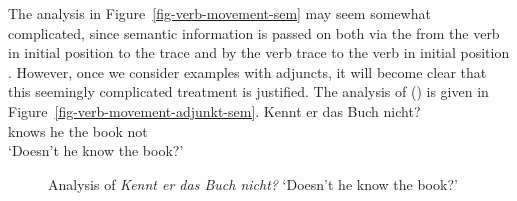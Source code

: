The analysis in Figure~\ref{fig-verb-movement-sem} may seem somewhat complicated, since semantic information is passed on both
via the \dsl from the verb in initial position to the trace  and by the verb trace to the verb in
initial position . However, once we consider examples with adjuncts, it will become clear that this seemingly complicated treatment is justified. The analysis of () is given in 
Figure~\vref{fig-verb-movement-adjunkt-sem}.
\ea
\gll Kennt er das Buch nicht?\\
	 knows he the book not\\
\glt `Doesn't he know the book?'
\z
\begin{figure}
\caption{Analysis of \emph{Kennt er das Buch nicht?} `Doesn't he
  know the book?'}\label{fig-verb-movement-adjunkt-sem}
\end{figure}



